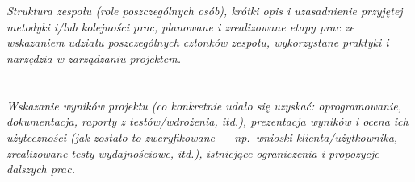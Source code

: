 \documentclass[polish]{aghengthesis}
\newcommand{\listofalgorithmes}{\tocfile{\listalgorithmcfname}{loa}}
\renewcommand\lstlistlistingname{\LangListOfListings}
\renewcommand{\lstlistoflistings}{\begingroup
\tocfile{\lstlistlistingname}{lol}
\endgroup}
\begin{document}
\chapter{\ChapterTitleWorkOrganization}
\label{sec:organizacja-pracy}

\emph{Struktura zespołu (role poszczególnych osób), krótki opis i uzasadnienie przyjętej metodyki i/lub kolejności prac, planowane i zrealizowane etapy prac ze wskazaniem udziału poszczególnych członków zespołu, wykorzystane praktyki i narzędzia w zarządzaniu projektem.}

\chapter{\ChapterTitleResults}
\label{sec:wyniki-projektu}

\emph{Wskazanie wyników projektu (co konkretnie udało się uzyskać: oprogramowanie, dokumentacja, raporty z testów/wdrożenia, itd.), prezentacja wyników i ocena ich użyteczności (jak zostało to zweryfikowane --- np.\ wnioski klienta/użytkownika, zrealizowane testy wydajnościowe, itd.), istniejące ograniczenia i propozycje dalszych prac.}

\printbibliography
\listoffigures
\listoftables
\listofalgorithmes
\lstlistoflistings
\end{document}
